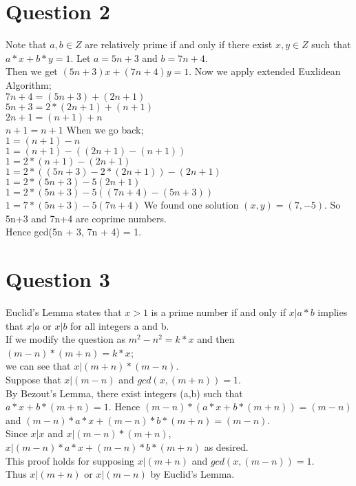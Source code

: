 \documentclass[12pt]{article}
\begin{document}
\section*{Question 2}
Note that $a,b \in Z$ are relatively prime if and only if there exist $x,y \in Z$ such that $a*x+b*y=1$. Let $a=5n+3$ and $b=7n+4.$\\
Then we get $(5n+3)x+(7n+4)y=1$. Now we apply extended Euxlidean Algorithm; \\
$7n+4 = (5n+3) + (2n+1)$ \\
$5n+3 = 2*(2n+1) + (n+1)$ \\
$2n+1 = (n+1) + n$ \\
$n+1 = n + 1$  When we go back; \\
$1 = (n+1) - n$ \\ 
$1 = (n+1) - ((2n+1)-(n+1))$ \\
$1 = 2*(n+1) - (2n+1)$ \\
$1 = 2*((5n+3)-2*(2n+1))-(2n+1)$ \\
$1 = 2*(5n+3) - 5(2n+1)$ \\
$1 = 2*(5n+3) - 5((7n+4)-(5n+3))$ \\
$1 = 7*(5n+3) - 5(7n+4)$ We found one solution $(x,y) = (7,-5)$. So 5n+3 and 7n+4 are coprime numbers. \\
Hence gcd(5n + 3, 7n + 4) = 1. \\

\section*{Question 3}
	Euclid's Lemma states that $x>1$ is a prime number if and only if $x|a*b$ implies that $x|a$ or $x|b$ for all integers a and b. \\
	If we modify the question as $m^2-n^2=k*x$ and then $(m-n)*(m+n)=k*x$; \\
we can see that $x|(m+n)*(m-n)$. \\
	Suppose that $x|(m-n)$ and $gcd(x,(m+n))=1$. \\
By Bezout's Lemma, there exist integers (a,b) such that \\
$a*x+b*(m+n)=1$. Hence $(m-n)*(a*x+b*(m+n))=(m-n)$ and $(m-n)*a*x+(m-n)*b*(m+n)=(m-n)$. \\
Since $x|x$ and $x|(m-n)*(m+n)$, $x|(m-n)*a*x+(m-n)*b*(m+n)$ as desired. \\ 
This proof holds for supposing $x|(m+n)$ and $gcd(x,(m-n))=1$. \\
	Thus $x|(m+n)$ or $x|(m-n)$ by Euclid's Lemma. \\
\end{document}
